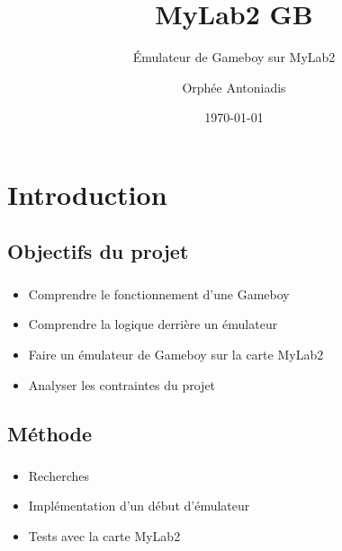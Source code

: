 \documentclass{beamer}
\begin{document}

\title{MyLab2 GB}
\subtitle{Émulateur de Gameboy sur MyLab2}
\author{Orphée Antoniadis}
\date{\today}

\begin{frame}
\titlepage
\end{frame}

\begin{frame}
	\setcounter{tocdepth}{1}
	\tableofcontents
\end{frame}


\section{Introduction}
\subsection{Objectifs du projet}
\begin{frame}
	\frametitle{\secname}
	\framesubtitle{\subsecname}
	\begin{itemize}
		\item Comprendre le fonctionnement d'une Gameboy
    \item Comprendre la logique derrière un émulateur
    \item Faire un émulateur de Gameboy sur la carte MyLab2
		\item Analyser les contraintes du projet
	\end{itemize}
\end{frame}


\subsection{Méthode}
\begin{frame}
	\frametitle{\secname}
	\framesubtitle{\subsecname}
	\begin{itemize}
		\item Recherches
		\item Implémentation d'un début d'émulateur
    \item Tests avec la carte MyLab2
	\end{itemize}
\end{frame}
\end{document}
